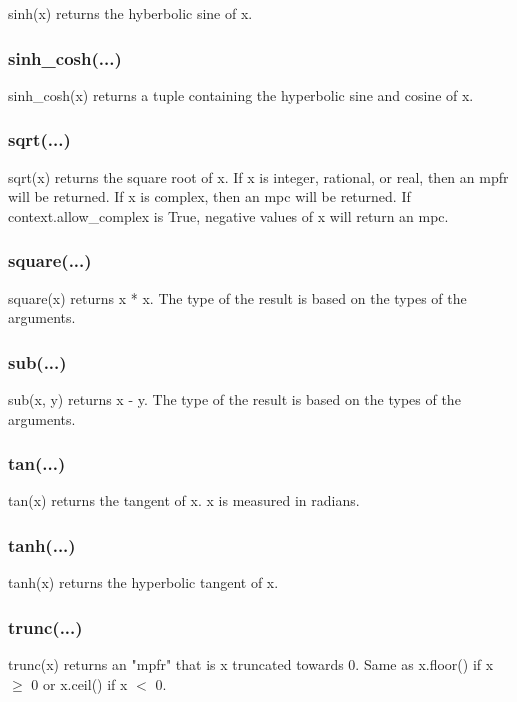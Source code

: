 sinh(x) returns the hyberbolic sine of x.

\subsubsection{sinh\_cosh(...)}

sinh\_cosh(x) returns a tuple containing the hyperbolic sine and cosine of x.

\subsubsection{sqrt(...)}

sqrt(x) returns the square root of x. If x is integer, rational, or real, then an mpfr will be
returned. If x is complex, then an mpc will be returned. If context.allow\_complex is True,
negative values of x will return an mpc.

\subsubsection{square(...)}

square(x) returns x * x. The type of the result is based on the types of the arguments.

\subsubsection{sub(...)}

sub(x, y) returns x - y. The type of the result is based on the types of the arguments.

\subsubsection{tan(...)}

tan(x) returns the tangent of x. x is measured in radians.

\subsubsection{tanh(...)}

tanh(x) returns the hyperbolic tangent of x.

\subsubsection{trunc(...)}

trunc(x) returns an "mpfr" that is x truncated towards 0. Same as x.floor() if x $\ge$ 0 or x.ceil() if
x $<$ 0.

